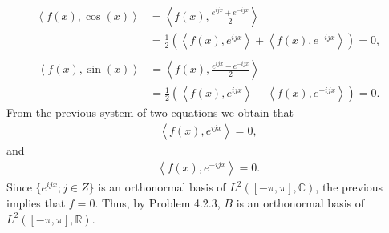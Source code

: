 \begin{questions}
\begin{solution}
\begin{align*}
\left<f(x),\cos(x)\right>&=\left<f(x),\frac{e^{ijx}+e^{-ijx}}{2}\right>\\
&=\frac{1}{2}\left(\left<f(x),e^{ijx}\right>+\left<f(x),e^{-ijx}\right>\right)=0,\\
\end{align*}
\begin{align*}
\left<f(x),\sin(x)\right>&=\left<f(x),\frac{e^{ijx}-e^{-ijx}}{2}\right>\\
&=\frac{1}{2}\left(\left<f(x),e^{ijx}\right>-\left<f(x),e^{-ijx}\right>\right)=0.
\end{align*}
From the previous system of two equations we obtain that
\begin{align*}
\left<f(x),e^{ijx}\right>=0,
\end{align*}
and
\begin{align*}
\left<f(x),e^{-ijx}\right>=0.
\end{align*}
Since $\{e^{ijx}; j \in Z\}$ is an orthonormal basis of $L^2([-\pi,\pi],\mathbb{C})$, the previous implies that $f=0$. Thus, by Problem 4.2.3, $B$ is an orthonormal basis of $L^2([-\pi,\pi],\mathbb{R})$.
\end{solution}
\end{questions}
